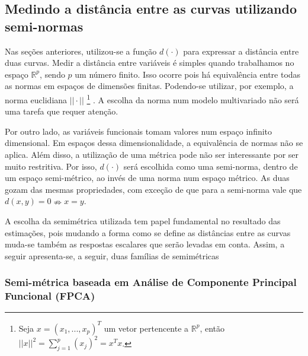 \documentclass[
	12pt,				%
	openright,			%
	oneside,			%
	a4paper,			%
	english,			%
	brazil				%
	]{dissertacao-ufrgs-abntex2}
\begin{document}
\subsection{Medindo a distância entre as curvas utilizando semi-normas} \label{sub:semimetricas}

Nas seções anteriores, utilizou-se a função $d(\cdot)$ para expressar
a distância entre duas curvas. Medir a distância entre variáveis é
simples quando trabalhamos no espaço $\mathbb{R}^{p}$, sendo $p$
um número finito. Isso ocorre pois há equivalência entre todas as
normas em espaços de dimensões finitas. Podendo-se utilizar, por exemplo,
a norma euclidiana $||\cdot||$%
\footnote{Seja $x=(x_{1},...,x_{p})^{T}$ um vetor pertencente a $\mathbb{R}^{p}$,
então$||x||^{2}=\sum_{j=1}^{p}(x_{j})^{2}=x^{T}x$.%
} . A escolha da norma num modelo multivariado não será uma tarefa
que requer atenção.

Por outro lado, as variáveis funcionais tomam valores num espaço infinito
dimensional. Em espaços dessa dimensionalidade, a equivalência de normas não se
aplica. Além disso, a utilização de uma métrica pode não ser interessante
por ser muito restritiva. Por isso, $d(\cdot)$ será escolhida como
uma semi-norma, dentro de um espaço semi-métrico, ao invés de uma
norma num espaço métrico. As duas gozam das mesmas propriedades, com
exceção de que para a semi-norma vale que $d(x,y)=0\nRightarrow x=y$. 

A escolha da semimétrica utilizada tem papel fundamental no resultado das estimações, pois mudando a forma como se define as distâncias entre as curvas muda-se também as respostas escalares que serão levadas em conta. Assim, a seguir apresenta-se, a seguir, duas famílias de semimétricas

\subsubsection{Semi-métrica baseada em Análise de Componente Principal Funcional
(FPCA)}
\end{document}
